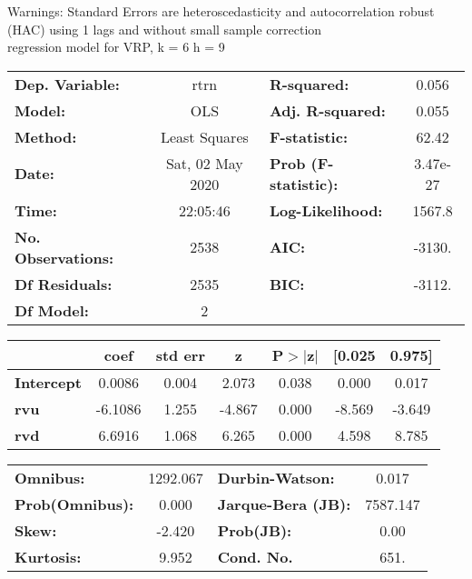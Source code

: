 Warnings: \newline
 [1] Standard Errors are heteroscedasticity and autocorrelation robust (HAC) using 1 lags and without small sample correction\\ 

regression model for VRP, k = 6 h = 9\begin{center}
\begin{tabular}{lclc}
\toprule
\textbf{Dep. Variable:}    &       rtrn       & \textbf{  R-squared:         } &     0.056   \\
\textbf{Model:}            &       OLS        & \textbf{  Adj. R-squared:    } &     0.055   \\
\textbf{Method:}           &  Least Squares   & \textbf{  F-statistic:       } &     62.42   \\
\textbf{Date:}             & Sat, 02 May 2020 & \textbf{  Prob (F-statistic):} &  3.47e-27   \\
\textbf{Time:}             &     22:05:46     & \textbf{  Log-Likelihood:    } &    1567.8   \\
\textbf{No. Observations:} &        2538      & \textbf{  AIC:               } &    -3130.   \\
\textbf{Df Residuals:}     &        2535      & \textbf{  BIC:               } &    -3112.   \\
\textbf{Df Model:}         &           2      & \textbf{                     } &             \\
\bottomrule
\end{tabular}
\begin{tabular}{lcccccc}
                   & \textbf{coef} & \textbf{std err} & \textbf{z} & \textbf{P$> |$z$|$} & \textbf{[0.025} & \textbf{0.975]}  \\
\midrule
\textbf{Intercept} &       0.0086  &        0.004     &     2.073  &         0.038        &        0.000    &        0.017     \\
\textbf{rvu}       &      -6.1086  &        1.255     &    -4.867  &         0.000        &       -8.569    &       -3.649     \\
\textbf{rvd}       &       6.6916  &        1.068     &     6.265  &         0.000        &        4.598    &        8.785     \\
\bottomrule
\end{tabular}
\begin{tabular}{lclc}
\textbf{Omnibus:}       & 1292.067 & \textbf{  Durbin-Watson:     } &    0.017  \\
\textbf{Prob(Omnibus):} &   0.000  & \textbf{  Jarque-Bera (JB):  } & 7587.147  \\
\textbf{Skew:}          &  -2.420  & \textbf{  Prob(JB):          } &     0.00  \\
\textbf{Kurtosis:}      &   9.952  & \textbf{  Cond. No.          } &     651.  \\
\bottomrule
\end{tabular}
\end{center}

